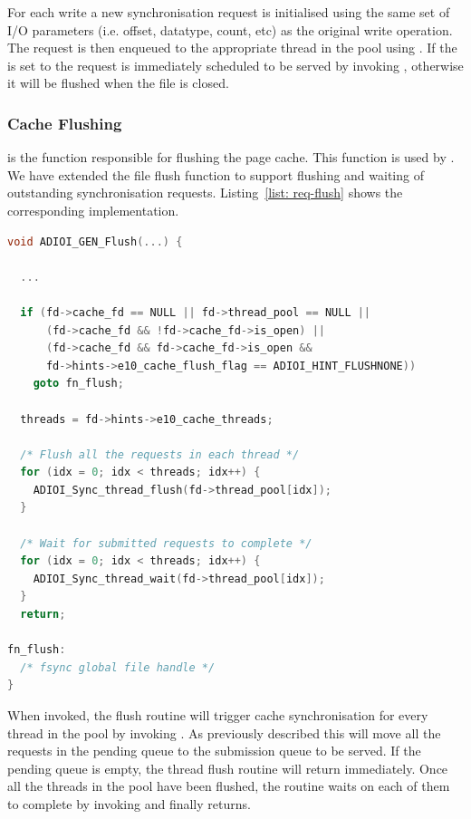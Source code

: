 For each write a new synchronisation request is initialised using the same set of I/O parameters (i.e. offset, datatype, count, etc) as the original write operation. The request is then enqueued to the appropriate thread in the pool using . If the  is set to  the request is immediately scheduled to be served by invoking , otherwise it will be flushed when the file is closed.

\subsubsection{Cache Flushing}
\label{subsubsec: cache-flush}
 is the function responsible for flushing the page cache. This function is used by . We have extended the file flush function to support flushing and waiting of outstanding synchronisation requests. Listing~\ref{list: req-flush} shows the corresponding implementation.

\begin{lstlisting}[language=C, caption=Cache Flushing, label={list: req-flush}]
void ADIOI_GEN_Flush(...) {

  ...

  if (fd->cache_fd == NULL || fd->thread_pool == NULL ||
      (fd->cache_fd && !fd->cache_fd->is_open) ||
      (fd->cache_fd && fd->cache_fd->is_open &&
      fd->hints->e10_cache_flush_flag == ADIOI_HINT_FLUSHNONE))
    goto fn_flush;

  threads = fd->hints->e10_cache_threads;

  /* Flush all the requests in each thread */
  for (idx = 0; idx < threads; idx++) {
    ADIOI_Sync_thread_flush(fd->thread_pool[idx]);
  }

  /* Wait for submitted requests to complete */
  for (idx = 0; idx < threads; idx++) {
    ADIOI_Sync_thread_wait(fd->thread_pool[idx]);
  }
  return;

fn_flush:
  /* fsync global file handle */
}
\end{lstlisting}

When invoked, the flush routine will trigger cache synchronisation for every thread in the pool by invoking . As previously described this will move all the requests in the pending queue to the submission queue to be served. If the pending queue is empty, the thread flush routine will return immediately. Once all the threads in the pool have been flushed, the routine waits on each of them to complete by invoking  and finally returns.

